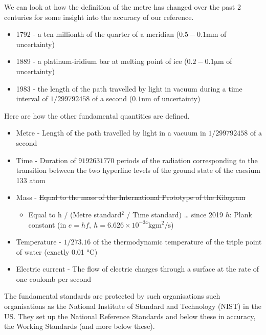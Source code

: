 We can look at how the definition of the metre has changed over the past 2 centuries for some insight into the accuracy of our reference.
\begin{itemize}
  \item 1792 - a ten millionth of the quarter of a meridian ($0.5 - 0.1 \si{\milli\m}$ of uncertainty)
  \item 1889 - a platinum-iridium bar at melting point of ice ($0.2-0.1 \si{\micro\m}$ of uncertainty)
  \item 1983 - the length of the path travelled by light in vacuum during a time interval of $1/299792458$ of a second ($0.1 \si{\nano\m}$ of uncertainty)
\end{itemize}
Here are how the other fundamental quantities are defined.
\begin{itemize}
  \item Metre - Length of the path travelled by light in a vacuum in $1/299792458$ of a second
  \item Time - Duration of $9192631770$ periods of the radiation corresponding to the transition between the two hyperfine levels of the ground state of the caesium 133 atom
  \item Mass - \sout{Equal to the mass of the International Prototype of the Kilogram}
        \begin{itemize}
          \item Equal to h / (Metre standard$^2$ / Time standard) … since 2019
                $h$: Plank constant (in $e = hf, \ h = 6.626 \times 10^{-34} \si{\kg\m\squared\per\second}$)
        \end{itemize}
  \item Temperature - $1/273.16$ of the thermodynamic temperature
        of the triple point of water (exactly 0.01 \si{\celsius})
  \item Electric current - The flow of electric charges through
        a surface at the rate of one coulomb per second
\end{itemize}
The fundamental standards are protected by such organisations such organisations as the National Institute of Standard and Technology (NIST) in the US. They set up the National Reference Standards and below these in accuracy, the Working Standards (and more below these).
